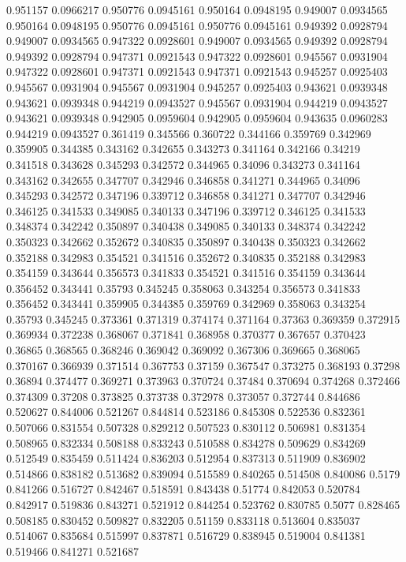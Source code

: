 0.951157 0.0966217
0.950776 0.0945161
0.950164 0.0948195
0.949007 0.0934565
0.950164 0.0948195
0.950776 0.0945161
0.950776 0.0945161
0.949392 0.0928794
0.949007 0.0934565
0.947322 0.0928601
0.949007 0.0934565
0.949392 0.0928794
0.949392 0.0928794
0.947371 0.0921543
0.947322 0.0928601
0.945567 0.0931904
0.947322 0.0928601
0.947371 0.0921543
0.947371 0.0921543
0.945257 0.0925403
0.945567 0.0931904
0.945567 0.0931904
0.945257 0.0925403
0.943621 0.0939348
0.943621 0.0939348
0.944219 0.0943527
0.945567 0.0931904
0.944219 0.0943527
0.943621 0.0939348
0.942905 0.0959604
0.942905 0.0959604
0.943635 0.0960283
0.944219 0.0943527
0.361419 0.345566
0.360722 0.344166
0.359769 0.342969
0.359905 0.344385
0.343162 0.342655
0.343273 0.341164
0.342166 0.34219
0.341518 0.343628
0.345293 0.342572
0.344965 0.34096
0.343273 0.341164
0.343162 0.342655
0.347707 0.342946
0.346858 0.341271
0.344965 0.34096
0.345293 0.342572
0.347196 0.339712
0.346858 0.341271
0.347707 0.342946
0.346125 0.341533
0.349085 0.340133
0.347196 0.339712
0.346125 0.341533
0.348374 0.342242
0.350897 0.340438
0.349085 0.340133
0.348374 0.342242
0.350323 0.342662
0.352672 0.340835
0.350897 0.340438
0.350323 0.342662
0.352188 0.342983
0.354521 0.341516
0.352672 0.340835
0.352188 0.342983
0.354159 0.343644
0.356573 0.341833
0.354521 0.341516
0.354159 0.343644
0.356452 0.343441
0.35793 0.345245
0.358063 0.343254
0.356573 0.341833
0.356452 0.343441
0.359905 0.344385
0.359769 0.342969
0.358063 0.343254
0.35793 0.345245
0.373361 0.371319
0.374174 0.371164
0.37363 0.369359
0.372915 0.369934
0.372238 0.368067
0.371841 0.368958
0.370377 0.367657
0.370423 0.36865
0.368565 0.368246
0.369042 0.369092
0.367306 0.369665
0.368065 0.370167
0.366939 0.371514
0.367753 0.37159
0.367547 0.373275
0.368193 0.37298
0.36894 0.374477
0.369271 0.373963
0.370724 0.37484
0.370694 0.374268
0.372466 0.374309
0.37208 0.373825
0.373738 0.372978
0.373057 0.372744
0.844686 0.520627
0.844006 0.521267
0.844814 0.523186
0.845308 0.522536
0.832361 0.507066
0.831554 0.507328
0.829212 0.507523
0.830112 0.506981
0.831354 0.508965
0.832334 0.508188
0.833243 0.510588
0.834278 0.509629
0.834269 0.512549
0.835459 0.511424
0.836203 0.512954
0.837313 0.511909
0.836902 0.514866
0.838182 0.513682
0.839094 0.515589
0.840265 0.514508
0.840086 0.5179
0.841266 0.516727
0.842467 0.518591
0.843438 0.51774
0.842053 0.520784
0.842917 0.519836
0.843271 0.521912
0.844254 0.523762
0.830785 0.5077
0.828465 0.508185
0.830452 0.509827
0.832205 0.51159
0.833118 0.513604
0.835037 0.514067
0.835684 0.515997
0.837871 0.516729
0.838945 0.519004
0.841381 0.519466
0.841271 0.521687
